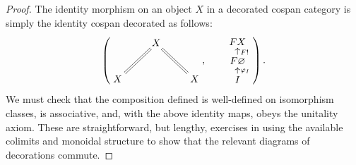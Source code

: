 \begin{proof}
  The identity morphism on an object $X$ in a decorated cospan category is
  simply the identity cospan decorated as follows:
  \[
    \left(
    \begin{aligned}
      \xymatrix{
	& X \\  
	X \ar@{=}[ur] && X \ar@{=}[ul]
      }
    \end{aligned}
    ,
    \qquad
    \begin{aligned}
      \xymatrixrowsep{.5pc}
      \xymatrix{
	FX \\
	F\varnothing \ar[u]_{F!} \\
	I \ar[u]_{\varphi_I}
      }
    \end{aligned}
    \right).
  \]
  We must check that the composition defined is well-defined on isomorphism
  classes, is associative, and, with the above identity maps, obeys the
  unitality axiom. These are straightforward, but lengthy, exercises in
  using the available colimits and monoidal structure to show that
  the relevant diagrams of decorations commute.


\end{proof}
